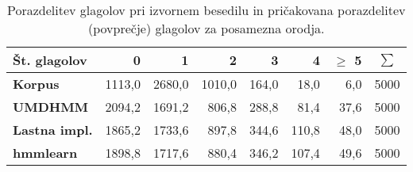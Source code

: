 \begin{table}
\centering
\begin{tabular}{l rrrrrr c}
\toprule
{\bf Št. glagolov} & {\bf 0} & {\bf 1} & {\bf 2} & {\bf 3} & {\bf 4} & {\bf $\geq$ 5} & {\bf $\sum$} \\
\midrule
{\bf Korpus}        & 1113,0 & 2680,0 & 1010,0 & 164,0 &  18,0 &  6,0 & 5000 \\
{\bf UMDHMM}        & 2094,2 & 1691,2 &  806,8 & 288,8 &  81,4 & 37,6 & 5000 \\
{\bf Lastna impl.}  & 1865,2 & 1733,6 &  897,8 & 344,6 & 110,8 & 48,0 & 5000 \\
{\bf hmmlearn}      & 1898,8 & 1717,6 &  880,4 & 346,2 & 107,4 & 49,6 & 5000 \\
\bottomrule
\end{tabular}
\caption{Porazdelitev glagolov pri izvornem besedilu in pričakovana
  porazdelitev (povprečje) glagolov za posamezna orodja.}
\label{tab:bench:model_averages_comparison}
\end{table}
